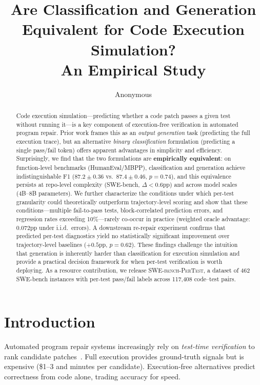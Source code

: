 \documentclass[11pt,a4paper]{article}
\title{Are Classification and Generation Equivalent for Code Execution Simulation?\\An Empirical Study}
\author{Anonymous}
\begin{document}
\maketitle

\begin{abstract}
Code execution simulation---predicting whether a code patch passes a given test without running it---is a key component of execution-free verification in automated program repair.
Prior work frames this as an \emph{output generation} task (predicting the full execution trace), but an alternative \emph{binary classification} formulation (predicting a single pass/fail token) offers apparent advantages in simplicity and efficiency.
Surprisingly, we find that the two formulations are \textbf{empirically equivalent}: on function-level benchmarks (HumanEval/MBPP), classification and generation achieve indistinguishable F1 ($87.2\pm0.36$ vs.\ $87.4\pm0.46$, $p{=}0.74$), and this equivalence persists at repo-level complexity (SWE-bench, $\Delta{<}0.6$pp) and across model scales (4B--8B parameters).
We further characterize the conditions under which per-test granularity could theoretically outperform trajectory-level scoring and show that these conditions---multiple fail-to-pass tests, block-correlated prediction errors, and regression rates exceeding 10\%---rarely co-occur in practice (weighted oracle advantage: 0.072pp under i.i.d.\ errors).
A downstream re-repair experiment confirms that predicted per-test diagnostics yield no statistically significant improvement over trajectory-level baselines ($+0.5$pp, $p{=}0.62$).
These findings challenge the intuition that generation is inherently harder than classification for execution simulation and provide a practical decision framework for when per-test verification is worth deploying.
As a resource contribution, we release \textsc{SWE-bench-PerTest}, a dataset of 462 SWE-bench instances with per-test pass/fail labels across 117{,}408 code--test pairs.
\end{abstract}

\section{Introduction}

Automated program repair systems increasingly rely on \emph{test-time verification} to rank candidate patches~\cite{chen2024swebench,jimenez2024swebench}.
Full execution provides ground-truth signals but is expensive (\$1--3 and minutes per candidate).
Execution-free alternatives predict correctness from code alone, trading accuracy for speed.
\end{document}
